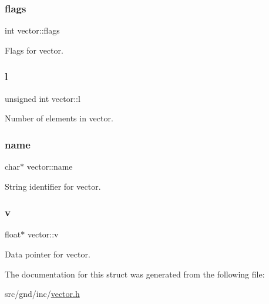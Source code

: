 \subsubsection{\texorpdfstring{flags}{flags}}
{\footnotesize\ttfamily int vector\+::flags}



Flags for vector. 

\mbox{\label{structvector_a95c5d324db1053c979145cea94d5263e}} 
\subsubsection{\texorpdfstring{l}{l}}
{\footnotesize\ttfamily unsigned int vector\+::l}



Number of elements in vector. 

\mbox{\label{structvector_aa03a1f4dcbfcd7b3f2e3393234dbc4a2}} 
\subsubsection{\texorpdfstring{name}{name}}
{\footnotesize\ttfamily char$\ast$ vector\+::name}



String identifier for vector. 

\mbox{\label{structvector_acfc0ef4d07bb980f28ce9a55e70ed074}} 
\subsubsection{\texorpdfstring{v}{v}}
{\footnotesize\ttfamily float$\ast$ vector\+::v}



Data pointer for vector. 



The documentation for this struct was generated from the following file\+:\begin{DoxyCompactItemize}
\item 
src/gnd/inc/\hyperlink{vector_8h}{vector.\+h}\end{DoxyCompactItemize}
